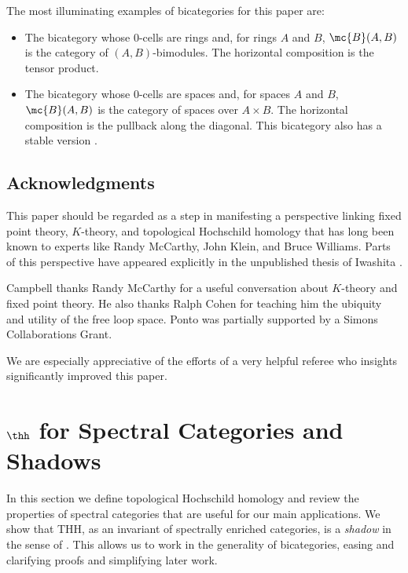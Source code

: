 \documentclass[11pt]{amsart}
\begin{document}
The most illuminating examples of bicategories for this paper are: 
%
\begin{itemize}
  \item The bicategory whose 0-cells are rings and, for rings $A$ and $B$, $\mc{B}(A,B)$ is the category of $(A,B)$-bimodules.  The horizontal composition is the tensor product.
  \item The bicategory whose 0-cells are spaces and, for spaces $A$ and $B$, $\mc{B}(A,B)$ is the category of spaces over $A\times B$.  The  horizontal composition is the pullback 
along the diagonal.  This bicategory also has a stable version \cite{maysig:pht}.
\end{itemize}

\subsection{Acknowledgments} 

This paper should be regarded as a step in manifesting a  perspective linking fixed point theory, $K$-theory, and topological Hochschild homology that has long been known to experts like Randy McCarthy, John Klein, and Bruce Williams. Parts of this perspective have appeared explicitly in the unpublished thesis of Iwashita \cite{iwashita}. 

Campbell thanks Randy McCarthy for a useful conversation about $K$-theory and fixed point theory. He also thanks Ralph Cohen for teaching him the ubiquity and utility of the free loop space. 
Ponto was partially supported by a Simons Collaborations Grant.

We are especially appreciative of the efforts of a very helpful referee who insights significantly improved this paper. 

\section{$\thh$ for Spectral Categories and Shadows}\label{sect:thh_spectral}

In this section we define topological Hochschild homology and review the properties of spectral categories that are useful for our main applications. We show that THH, as an invariant of spectrally enriched categories, is a 
\textit{shadow} in the sense of \cite{p:thesis}. 
This allows us to work in the generality of bicategories, easing and clarifying proofs and simplifying later work.  
\end{document}
